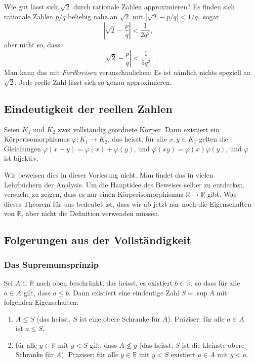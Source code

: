 \documentclass[../main.tex]{subfiles}
\begin{document}
\begin{einschub}
  Wie gut lässt sich $\sqrt 2$ durch rationale Zahlen
  approximieren? Es finden sich rationale Zahlen $p/q$ beliebig
  nahe an $\sqrt 2$ mit
  \(
    \left\vert \sqrt 2 - {p}/{q} \right\vert < {1}/{q},
  \)
  sogar
  \[
    \left\vert \sqrt 2 - \frac{p}{q} \right\vert < \frac{1}{2q^2},
  \]
  aber nicht so, dass
  \[
    \left\vert \sqrt 2 - \frac{p}{q} \right\vert < \frac{1}{5q^2}.
  \]
  Man kann das mit \emph{Fordkreisen} veranschaulichen:
  Es ist nämlich nichts speziell an $\sqrt 2$. Jede reelle Zahl
  lässt sich so genau approximieren.
\end{einschub}

\subsection*{Eindeutigkeit der reellen Zahlen}
\begin{theorem}[Dedekind]
  Seien $K_1$ und $K_2$ zwei vollständig geordnete Körper.
  Dann existiert ein Körperisomorphismus
  $\varphi\colon K_1 \to K_2$, das heisst,
	   für alle $x, y \in K_1$ gelten die
     Gleichungen $\varphi(x+y)
		  = \varphi(x) + \varphi(y)$,
		  und $\varphi(xy) = \varphi(x)\varphi(y)$,
	und $\varphi$ ist bijektiv.
\end{theorem}
Wir beweisen dies in dieser Vorlesung nicht.
Man findet das in vielen Lehrbüchern der Analysis.
Um die Hauptidee des Beweises selber zu entdecken,
versuche zu zeigen, dass es nur einen Körperisomorphismus
$\mathbb{R} \to \mathbb{R}$ gibt.
Was dieses Theorem für uns bedeutet ist, dass wir ab jetzt
nur noch die Eigenschaften von $\mathbb{R}$, aber nicht
die Definition verwenden müssen.

\subsection*{Folgerungen aus der Vollständigkeit}
\subsubsection*{Das Supremumsprinzip}
\begin{supremum}
Sei $A \subset \mathbb{R}$ nach oben beschränkt,
das heisst, es existiert $b \in \mathbb{R}$, so dass
für alle $a \in A$ gilt, dass $a \leq b$.
Dann existiert eine eindeutige Zahl $S = \sup A$
mit folgenden Eigenschaften:
\begin{enumerate}[\normalfont(i)]
	\item $A \leq S$ (das heisst, $S$ ist eine obere Schranke
		für $A$). Präziser: für alle $a \in A$
		ist $a \leq S$.
  \item für alle $y \in \mathbb{R}$ mit $y < S$ gilt,
	  dass $A \not \leq y$ (das heisst, $S$ ist die kleinste
	  obere Schranke für $A$). Präziser: für alle $y \in \mathbb{R}$
	  mit $y < S$ existiert $a \in A$ mit $y < a$.
\end{enumerate}
\end{supremum}
\end{document}
